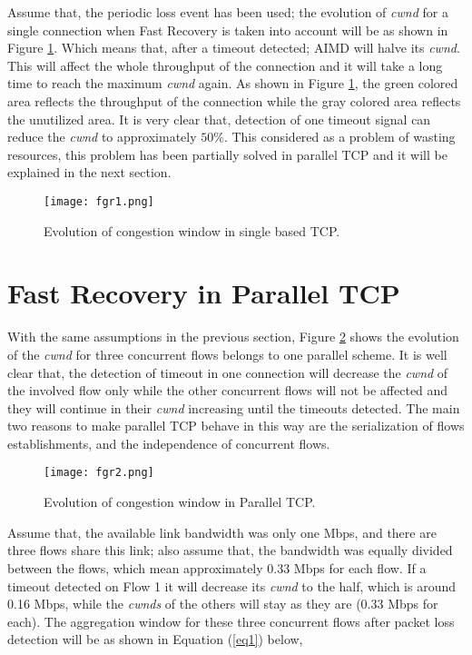\documentclass[a4paper, conference]{IEEEtran}
\begin{document}
Assume that, the periodic loss event has been used; the evolution of \textit{cwnd} for a single connection when Fast Recovery is taken into account will be as shown in Figure \ref{evo-single}. Which means that, after a timeout detected; AIMD will halve its \textit{cwnd}. This will affect the whole throughput of the connection and it will take a long time to reach the maximum \textit{cwnd} again. As shown in Figure \ref{evo-single}, the green colored area reflects the throughput of the connection while the gray colored area reflects the unutilized area. It is very clear that, detection of one timeout signal can reduce the \textit{cwnd} to approximately $50\%$. This considered as a problem of wasting resources, this problem has been partially solved in parallel TCP and it will be explained in the next section.

\begin{figure}[h]
\centerline{\texttt{[image: fgr1.png]}}
\caption{Evolution of congestion window in single based TCP.}
\label{evo-single}
\end{figure}

\section{Fast Recovery in Parallel TCP}

With the same assumptions in the previous section, Figure \ref{evo-parallel} shows the evolution of the \textit{cwnd} for three concurrent flows belongs to one parallel scheme. It is well clear that, the detection of timeout in one connection will decrease the \textit{cwnd} of the involved flow only while the other concurrent flows will not be affected and they will continue in their \textit{cwnd} increasing until the timeouts detected. The main two reasons to make parallel TCP behave in this way are the serialization of flows establishments, and the independence of concurrent flows.

\begin{figure}[h]
\centerline{\texttt{[image: fgr2.png]}}
\caption{Evolution of congestion window in Parallel TCP.}
\label{evo-parallel}
\end{figure}

Assume that, the available link bandwidth was only one Mbps, and there are three flows share this link; also assume that, the bandwidth was equally divided between the flows, which mean approximately 0.33 Mbps for each flow. If a timeout detected on Flow 1 it will decrease its \textit{cwnd} to the half, which is around 0.16 Mbps, while the \textit{cwnds} of the others will stay as they are (0.33 Mbps for each). The aggregation window for these three concurrent flows after packet loss detection will be as shown in Equation (\ref{eq1}) below,
\end{document}
